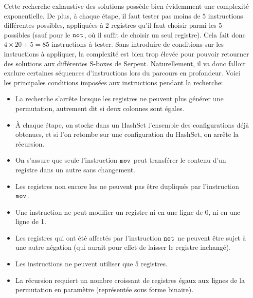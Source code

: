 \documentclass{article}
\begin{document}
Cette recherche exhaustive des solutions possède bien évidemment une complexité exponentielle. De plus, à chaque étape, il faut tester pas moins de $5$ instructions différentes possibles, appliquées à $2$ registres qu'il faut choisir parmi les $5$ possibles (sauf pour le $\mathtt{not}\:\!$, où il suffit de choisir un seul registre). Cela fait donc $4 \times 20+5=85$ instructions à tester. Sans introduire de conditions sur les instructions à appliquer, la complexité est bien trop élevée pour pouvoir retourner des solutions aux différentes S-boxes de Serpent.
\medbreak
Naturellement, il va donc falloir exclure certaines séquences d'instructions lors du parcours en profondeur. Voici les principales conditions imposées aux instructions pendant la recherche:
\medbreak
\begin{itemize}
\setlength\itemsep{1em}
\item La recherche s'arrête lorsque les registres ne peuvent plus générer une permutation, autrement dit si deux colonnes sont égales.

\item À chaque étape, on stocke dans un HashSet l'ensemble des configurations déjà obtenues, et si l'on retombe sur une configuration du HashSet, on arrête la récursion.

\item On s'assure que seule l'instruction $\mathtt{mov}\:\!$ peut transférer le contenu d'un registre dans un autre sans changement.

\item Les registres non encore lus ne peuvent pas être dupliqués par l'instruction $\mathtt{mov}\:\!$.

\item Une instruction ne peut modifier un registre ni en une ligne de 0, ni en une ligne de 1.
\item Les registres qui ont été affectés par l'instruction $\mathtt{not}\:\!$ ne peuvent être sujet à une autre négation (qui aurait pour effet de laisser le registre inchangé).

\item Les instructions ne peuvent utiliser que 5 registres.

\item La récursion requiert un nombre croissant de registres égaux aux lignes de la permutation en paramètre (représentée sous forme binaire).


\end{itemize}

\medbreak
\end{document}

